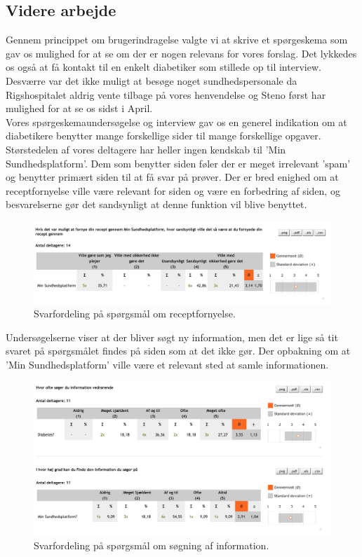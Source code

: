 \subsection{Videre arbejde}
Gennem princippet om brugerindragelse valgte vi at skrive et spørgeskema som gav os mulighed for at se om der er nogen relevans for vores forslag. Det lykkedes os også at få kontakt til en enkelt diabetiker som stillede op til interview. Desværre var det ikke muligt at besøge noget sundhedspersonale da Rigshospitalet aldrig vente tilbage på vores henvendelse og Steno først har mulighed for at se os sidst i April.\\
Vores spørgeskemaundersøgelse og interview gav os en generel indikation om at diabetikere benytter mange forskellige sider til mange forskellige opgaver. Størstedelen af vores deltagere har heller ingen kendskab til 'Min Sundhedsplatform'. Dem som benytter siden føler der er meget irrelevant 'spam' og benytter primært siden til at få svar på prøver. Der er bred enighed om at receptfornyelse ville være relevant for siden og være en forbedring af siden, og besvarelserne gør det sandsynligt at denne funktion vil blive benyttet.

\begin{figure}[H]
	\centering
	\includegraphics[width=\textwidth]{Materials/Receptfornyelse}
	\caption{Svarfordeling på spørgsmål om receptfornyelse.}
\end{figure}

Undersøgelserne viser at der bliver søgt ny information, men det er lige så tit svaret på spørgsmålet findes på siden som at det ikke gør. Der opbakning om at 'Min Sundhedsplatform' ville være et relevant sted at samle informationen.
 
\begin{figure}[H]
	\centering
	\includegraphics[width=\textwidth]{Materials/SeekingInformation}
	\caption{Svarfordeling på spørgsmål om søgning af information.}
\end{figure}

